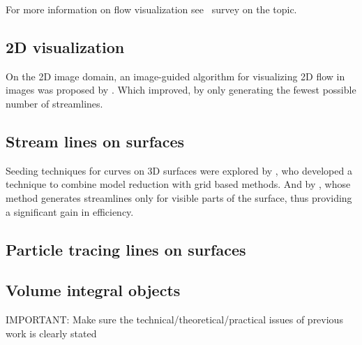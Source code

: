 For more information on flow visualization see~\cite{McLoughlin2010} survey on the topic.

\subsection{2D visualization}

On the 2D image domain, an image-guided algorithm for visualizing 2D flow in images was proposed by \cite{Turk1996}.
Which \cite{Li2008} improved, by only generating the fewest possible number of streamlines. 

\subsection{Stream lines on surfaces}

Seeding techniques for curves on 3D surfaces were explored by  \cite{Wicke2009}, who developed a technique to combine model reduction with grid based methods.
And by \cite{Spencer2009}, whose method generates streamlines only for visible parts of the surface, thus providing a significant gain in efficiency.

\subsection{Particle tracing lines on surfaces}

\subsection{Volume integral objects}


IMPORTANT: Make sure the technical/theoretical/practical issues of previous work is clearly stated 
